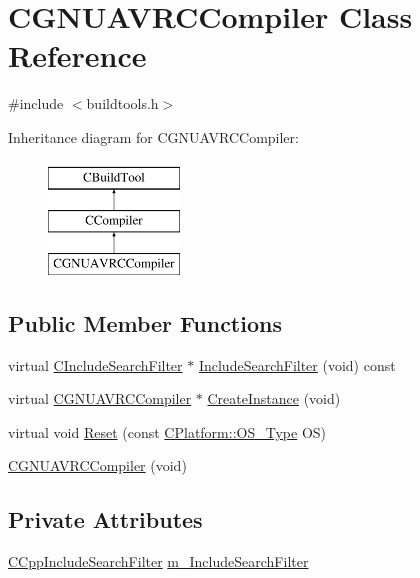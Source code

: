 \hypertarget{classCGNUAVRCCompiler}{\section{C\-G\-N\-U\-A\-V\-R\-C\-Compiler Class Reference}
\label{classCGNUAVRCCompiler}
}


{\ttfamily \#include $<$buildtools.\-h$>$}

Inheritance diagram for C\-G\-N\-U\-A\-V\-R\-C\-Compiler\-:\begin{figure}[H]
\begin{center}
\leavevmode
\includegraphics[height=3.000000cm]{da/d57/classCGNUAVRCCompiler}
\end{center}
\end{figure}
\subsection*{Public Member Functions}
\begin{DoxyCompactItemize}
\item 
virtual \hyperlink{classCIncludeSearchFilter}{C\-Include\-Search\-Filter} $\ast$ \hyperlink{classCGNUAVRCCompiler_a278ccc28910fb9cb8a20587bd966cf55}{Include\-Search\-Filter} (void) const 
\item 
virtual \hyperlink{classCGNUAVRCCompiler}{C\-G\-N\-U\-A\-V\-R\-C\-Compiler} $\ast$ \hyperlink{classCGNUAVRCCompiler_ad5630a463e0a41b5ecf28295f2c16e2f}{Create\-Instance} (void)
\item 
virtual void \hyperlink{classCGNUAVRCCompiler_a7f1f5abcd42d933e732c33bae1e18763}{Reset} (const \hyperlink{classCPlatform_a2fb735c63c53052f79629e338bb0f535}{C\-Platform\-::\-O\-S\-\_\-\-Type} O\-S)
\item 
\hyperlink{classCGNUAVRCCompiler_a467f142114353953863ad9bf449e1d77}{C\-G\-N\-U\-A\-V\-R\-C\-Compiler} (void)
\end{DoxyCompactItemize}
\subsection*{Private Attributes}
\begin{DoxyCompactItemize}
\item 
\hyperlink{classCCppIncludeSearchFilter}{C\-Cpp\-Include\-Search\-Filter} \hyperlink{classCGNUAVRCCompiler_a13660a7280c7109415125bbe4641246b}{m\-\_\-\-Include\-Search\-Filter}
\end{DoxyCompactItemize}
